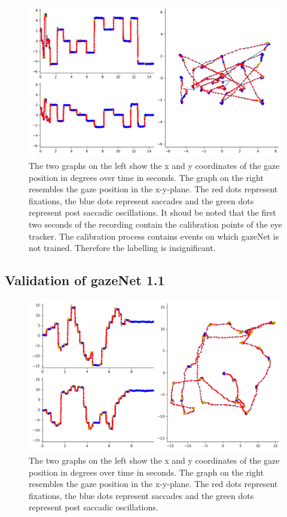 \documentclass[conference]{IEEEtran}
\begin{document}
\begin{figure}[ht]
    \includegraphics[width=\linewidth]{Kreuze_Random Recording1_short}
    \caption{The two graphs on the left show the x and y coordinates of the gaze position in degrees over time in seconds. The graph on the right resembles the gaze position in the x-y-plane. The red dots represent fixations, the blue dots represent saccades and the green dots represent post saccadic oscillations. It shoud be noted that the first two seconds of the recording contain the calibration points of the eye tracker. The calibration process contains events on which gazeNet is not trained. Therefore the labelling is insignificant.}
\end{figure}

\subsection{Validation of gazeNet 1.1}
\begin{figure}[ht]
    \includegraphics[width=\linewidth]{TH34_img_Europe_labelled_MN}
    \caption{The two graphs on the left show the x and y coordinates of the gaze position in degrees over time in seconds. The graph on the right resembles the gaze position in the x-y-plane. The red dots represent fixations, the blue dots represent saccades and the green dots represent post saccadic oscillations.}
\end{figure}



\end{document}
